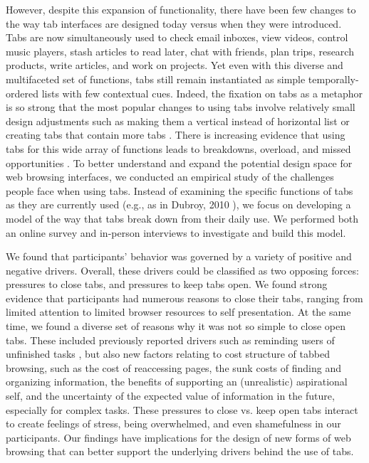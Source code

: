 However, despite this expansion of functionality, there have been few changes to the way tab interfaces are designed today versus when they were introduced. Tabs are now simultaneously used to check email inboxes, view videos, control music players, stash articles to read later, chat with friends, plan trips, research products, write articles, and work on projects. Yet even with this diverse and multifaceted set of functions, tabs still remain instantiated as simple temporally-ordered lists with few contextual cues. Indeed, the fixation on tabs as a metaphor is so strong that the most popular changes to using tabs involve relatively small design adjustments such as making them a vertical instead of horizontal list \cite{vtabs} or creating tabs that contain more tabs \cite{treetabs}. 
There is increasing evidence that using tabs for this wide array of functions leads to breakdowns, overload, and missed opportunities \cite{web1, web2, web3, web4, web5}.
To better understand and expand the potential design space for web browsing interfaces, we conducted an empirical study of the challenges people face when using tabs. Instead of examining the specific functions of tabs as they are currently used (e.g., as in Dubroy, 2010 \cite{Dubroy:2010:STB:1753326.1753426}), we focus on developing a model of the way that tabs break down from their daily use. We performed both an online survey and in-person interviews to investigate and build this model.

We found that participants' behavior was governed by a variety of positive and negative drivers. Overall, these drivers could be classified as two opposing forces: pressures to close tabs, and pressures to keep tabs open.  We found strong evidence that participants had numerous reasons to close their tabs, ranging from limited attention to limited browser resources to self presentation.  At the same time, we found a diverse set of reasons why it was not so simple to close open tabs. These included previously reported drivers such as reminding users of unfinished tasks \cite{Dubroy:2010:STB:1753326.1753426}, but also new factors relating to cost structure of tabbed browsing, such as the cost of reaccessing pages, the sunk costs of finding and organizing information, the benefits of supporting an (unrealistic) aspirational self, and the uncertainty of the expected value of information in the future, especially for complex tasks. These pressures to close vs. keep open tabs interact to create feelings of stress, being overwhelmed, and even shamefulness in our participants. Our findings have implications for the design of new forms of web browsing that can better support the underlying drivers behind the use of tabs.

